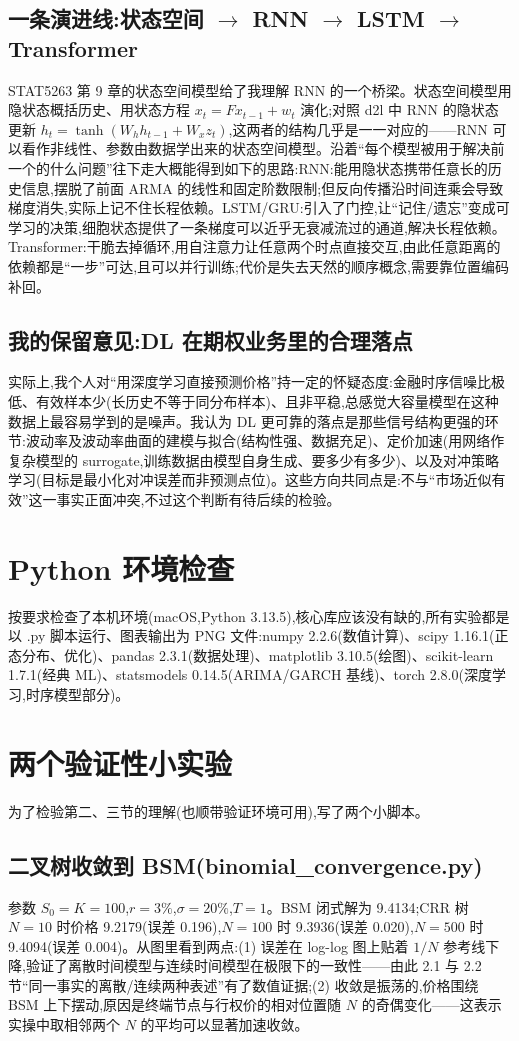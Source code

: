 \documentclass[11pt]{ctexart}
\begin{document}
\subsection{一条演进线:状态空间 $\to$ RNN $\to$ LSTM $\to$ Transformer}
STAT5263 第 9 章的状态空间模型给了我理解 RNN 的一个桥梁。状态空间模型用隐状态概括历史、用状态方程 $x_t = F x_{t-1} + w_t$ 演化;对照 d2l 中 RNN 的隐状态更新 $h_t = \tanh(W_h h_{t-1} + W_x z_t)$,这两者的结构几乎是一一对应的——RNN 可以看作非线性、参数由数据学出来的状态空间模型。沿着``每个模型被用于解决前一个的什么问题''往下走大概能得到如下的思路:RNN:能用隐状态携带任意长的历史信息,摆脱了前面 ARMA 的线性和固定阶数限制;但反向传播沿时间连乘会导致梯度消失,实际上记不住长程依赖。LSTM/GRU:引入了门控,让``记住/遗忘''变成可学习的决策,细胞状态提供了一条梯度可以近乎无衰减流过的通道,解决长程依赖。Transformer:干脆去掉循环,用自注意力让任意两个时点直接交互,由此任意距离的依赖都是``一步''可达,且可以并行训练;代价是失去天然的顺序概念,需要靠位置编码补回。

\subsection{我的保留意见:DL 在期权业务里的合理落点}
实际上,我个人对``用深度学习直接预测价格''持一定的怀疑态度:金融时序信噪比极低、有效样本少(长历史不等于同分布样本)、且非平稳,总感觉大容量模型在这种数据上最容易学到的是噪声。我认为 DL 更可靠的落点是那些信号结构更强的环节:波动率及波动率曲面的建模与拟合(结构性强、数据充足)、定价加速(用网络作复杂模型的 surrogate,训练数据由模型自身生成、要多少有多少)、以及对冲策略学习(目标是最小化对冲误差而非预测点位)。这些方向共同点是:不与``市场近似有效''这一事实正面冲突,不过这个判断有待后续的检验。

\section{Python 环境检查}
按要求检查了本机环境(macOS,Python 3.13.5),核心库应该没有缺的,所有实验都是以 .py 脚本运行、图表输出为 PNG 文件:numpy 2.2.6(数值计算)、scipy 1.16.1(正态分布、优化)、pandas 2.3.1(数据处理)、matplotlib 3.10.5(绘图)、scikit-learn 1.7.1(经典 ML)、statsmodels 0.14.5(ARIMA/GARCH 基线)、torch 2.8.0(深度学习,时序模型部分)。

\section{两个验证性小实验}
为了检验第二、三节的理解(也顺带验证环境可用),写了两个小脚本。

\subsection{二叉树收敛到 BSM(binomial\_convergence.py)}
参数 $S_0=K=100$,$r=3\%$,$\sigma=20\%$,$T=1$。BSM 闭式解为 9.4134;CRR 树 $N=10$ 时价格 9.2179(误差 0.196),$N=100$ 时 9.3936(误差 0.020),$N=500$ 时 9.4094(误差 0.004)。从图里看到两点:(1) 误差在 log-log 图上贴着 $1/N$ 参考线下降,验证了离散时间模型与连续时间模型在极限下的一致性——由此 2.1 与 2.2 节``同一事实的离散/连续两种表述''有了数值证据;(2) 收敛是振荡的,价格围绕 BSM 上下摆动,原因是终端节点与行权价的相对位置随 $N$ 的奇偶变化——这表示实操中取相邻两个 $N$ 的平均可以显著加速收敛。
\end{document}
